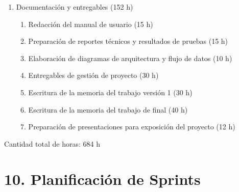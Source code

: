\documentclass[
11pt, %
]{charter}
\begin{document}
\begin{enumerate}
\begin{enumerate}
\end{enumerate}
\item Documentación y entregables (152 h)
\begin{enumerate}
\item Redacción del manual de usuario (15 h)
\item Preparación de reportes técnicos y resultados de pruebas (15 h)
\item Elaboración de diagramas de arquitectura y flujo de datos (10 h)
\item Entregables de gestión de proyecto (30 h)
\item Escritura de la memoria del trabajo versión 1 (30 h)
\item Escritura de la memoria del trabajo de final  (40 h)
\item Preparación de presentaciones para exposición del proyecto (12 h)
\end{enumerate}
\end{enumerate}

Cantidad total de horas: 684 h


\section{10. Planificación de Sprints}
\end{document}
